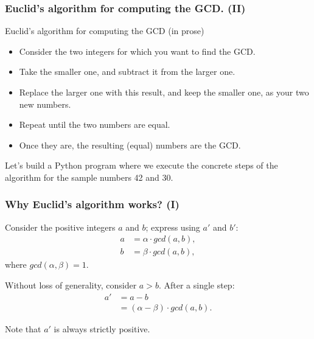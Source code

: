 \documentclass{beamer} %
\begin{document}
\begin{frame}
\frametitle{Euclid's algorithm for computing the GCD. (II)} 

\begin{block}{Euclid's algorithm for computing the GCD (in prose)}
\begin{itemize}
\item Consider the two integers for which you want to find the GCD.
\item Take the smaller one, and subtract it from the larger one. 
\item Replace the larger one with this result, and keep the smaller one, as your two new numbers. 
\item Repeat until the two numbers are equal. 
\item Once they are, the resulting (equal) numbers are the GCD.  
\end{itemize}
\end{block}

Let's build a Python program where we execute the concrete steps of the algorithm for the sample numbers 42 and 30.

\end{frame}

\begin{frame}
\frametitle{Why Euclid's algorithm works? (I)}

Consider the positive integers $a$ and $b$; express using $a'$ and $b'$:
\begin{align}
a &= \alpha \cdot gcd(a,b), \\
b &= \beta \cdot gcd(a,b),
\end{align}
where $gcd(\alpha, \beta) = 1.$

Without loss of generality, consider $a > b$. After a single step:
\begin{align}
a' &= a - b \\ 
    &= (\alpha - \beta) \cdot gcd(a,b).
\end{align}

Note that $a'$ is always strictly positive.

\end{frame}
\end{document}
